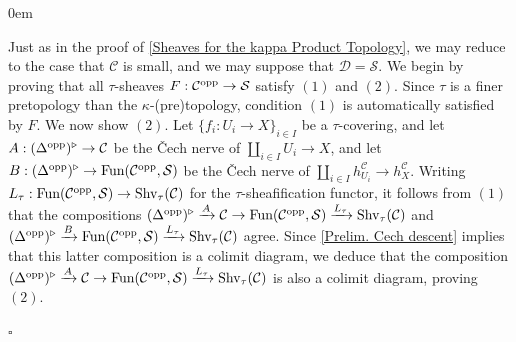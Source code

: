 \documentclass[10pt]{article}
\newcommand{\mS}{\mathcal S}
\newcommand{\C}{\mathcal C}
\newcommand{\cD}{\mathcal{D}}
\renewcommand{\qed}{\hfill$\square$}
\renewenvironment{proof}{\begin{addmargin}[1em]{0em}\begin{newproof}}{\end{newproof}\end{addmargin}\qed}
\theoremstyle{witharg}
\theoremstyle{witharg}
\theoremstyle{witharg2}
\begin{document}
\begin{proof}

     Just as in the proof of \ref{Sheaves for the kappa Product Topology}, we may reduce to the case that $\C$ is small, and we may suppose that $\cD=\mS$. We begin by proving that all $\tau$-sheaves $F:\C^{\textnormal{opp}}\rightarrow \mS$ satisfy $(1)$ and $(2)$. Since $\tau$ is a finer pretopology than the $\kappa$-(pre)topology, condition $(1)$ is automatically satisfied by $F$. We now show $(2)$. Let $\{f_i:U_i\rightarrow X\}_{i\in I}$ be a $\tau$-covering, and let $A:(\Delta^{\textnormal{opp}})^\triangleright\rightarrow \C$ be the \v{C}ech nerve of $\coprod_{i\in I}U_i\rightarrow X$, and let $B:(\Delta^{\textnormal{opp}})^\triangleright\rightarrow \textnormal{Fun}(\C^{\textnormal{opp}},\mS)$ be the \v{C}ech nerve of $\coprod_{i\in I}h^\C_{U_i}\rightarrow h^\C_X$. Writing $L_\tau:\textnormal{Fun}(\C^{\textnormal{opp}},\mS)\rightarrow \textnormal{Shv}_\tau(\C)$ for the $\tau$-sheafification functor, it follows from $(1)$ that the compositions $(\Delta^{\textnormal{opp}})^\triangleright\xrightarrow{A} \C\rightarrow \textnormal{Fun}(\C^{\textnormal{opp}},\mS)\xrightarrow{L_\tau}\textnormal{Shv}_\tau(\C)$ and $(\Delta^{\textnormal{opp}})^\triangleright\xrightarrow{B} \textnormal{Fun}(\C^{\textnormal{opp}},\mS)\xrightarrow{L_\tau}\textnormal{Shv}_\tau(\C)$ agree. Since \ref{Prelim. Cech descent} implies that this latter composition is a colimit diagram, we deduce that the composition $(\Delta^{\textnormal{opp}})^\triangleright\xrightarrow{A} \C\rightarrow \textnormal{Fun}(\C^{\textnormal{opp}},\mS)\xrightarrow{L_\tau}\textnormal{Shv}_\tau(\C)$ is also a colimit diagram, proving $(2)$. 



\end{proof}
\end{document}
